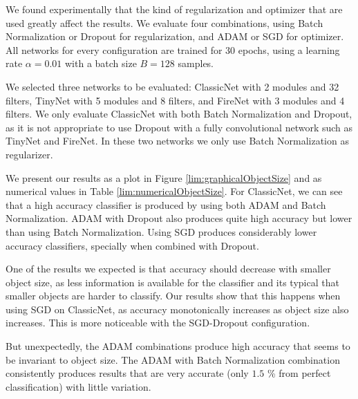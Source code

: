 We found experimentally \cite{valdenegro2017limits} that the kind of regularization and optimizer that are used greatly affect the results. We evaluate four combinations, using Batch Normalization or Dropout for regularization, and ADAM or SGD for optimizer. All networks for every configuration are trained for $30$ epochs, using a learning rate $\alpha = 0.01$ with a batch size $B = 128$ samples.

We selected three networks to be evaluated: ClassicNet with 2 modules and 32 filters, TinyNet with 5 modules and 8 filters, and FireNet with 3 modules and 4 filters. We only evaluate ClassicNet with both Batch Normalization and Dropout, as it is not appropriate to use Dropout with a fully convolutional network such as TinyNet and FireNet. In these two networks we only use Batch Normalization as regularizer.  

We present our results as a plot in Figure \ref{lim:graphicalObjectSize} and as numerical values in Table \ref{lim:numericalObjectSize}. For ClassicNet, we can see that a high accuracy classifier is produced by using both ADAM and Batch Normalization. ADAM with Dropout also produces quite high accuracy but lower than using Batch Normalization. Using SGD produces considerably lower accuracy classifiers, specially when combined with Dropout.

One of the results we expected is that accuracy should decrease with smaller object size, as less information is available for the classifier and its typical that smaller objects are harder to classify. Our results show that this happens when using SGD on ClassicNet, as accuracy monotonically increases as object size also increases. This is more noticeable with the SGD-Dropout configuration.

But unexpectedly, the ADAM combinations produce high accuracy that seems to be invariant to object size. The ADAM with Batch Normalization combination consistently produces results that are very accurate (only $1.5$ \% from perfect classification) with little variation.

